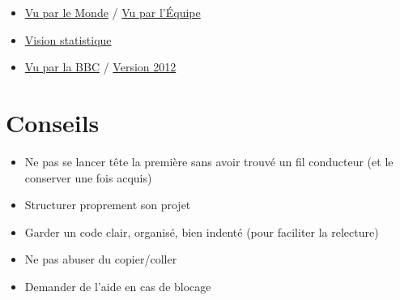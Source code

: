 \documentclass{article}
\begin{document}
\begin{itemize}

\item
\href{https://www.lemonde.fr/les-decodeurs/article/2018/02/26/jo-2018-et-si-on-revoyait-le-classement_5262807_4355770.html}{Vu par le Monde}
/
\href{http://www.wedodata.fr/equipe-jo2016.php}{Vu par l'Équipe}

\item
\href{https://www.statista.com/topics/1730/olympic-summer-games/}{Vision statistique}

\item

\href{https://www.bbc.com/sport/olympics/37148372}{Vu par la BBC}
/
\href{https://www.theguardian.com/commentisfree/2012/aug/03/london-2012-olympics-open-data}{Version 2012}

\end{itemize}

\section{Conseils}

\begin{itemize}

\item Ne pas se lancer tête la première sans avoir trouvé un fil conducteur (et le conserver une fois acquis)

\item Structurer proprement son projet

\item Garder un code clair, organisé, bien indenté (pour faciliter la relecture)

\item Ne pas abuser du copier/coller

\item Demander de l'aide en cas de blocage

\end{itemize}
\end{document}
